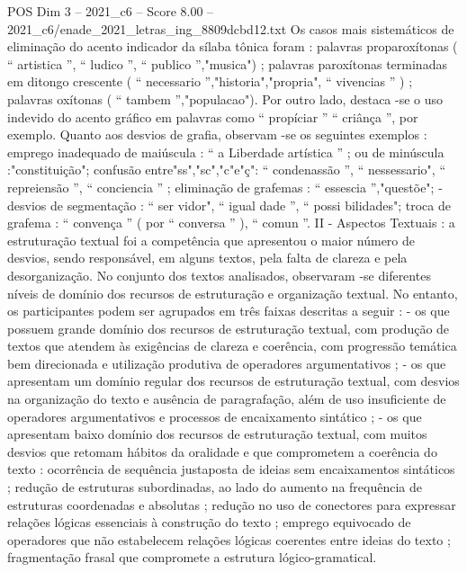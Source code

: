 \begin{textsample}{POS Dim 3 – 2021\_c6 – Score 8.00 – 2021\_c6/enade\_2021\_letras\_ing\_8809dcbd12.txt}
Os casos mais sistemáticos de eliminação do acento indicador da sílaba tônica foram : palavras proparoxítonas ( “ artistica ”, “ ludico ”, “ publico ”,"musica") ; palavras paroxítonas terminadas em ditongo crescente ( “ necessario ”,"historia","propria", “ vivencias ” ) ; palavras oxítonas ( “ tambem ”,"populacao").
Por outro lado, destaca -se o uso indevido do acento gráfico em palavras como “ propíciar ” “ criânça ”, por exemplo.
Quanto aos desvios de grafia, observam -se os seguintes exemplos : emprego inadequado de maiúscula : “ a Liberdade artística ” ; ou de minúscula :"constituição"; confusão entre"ss","sc","c"e"ç": “ condenassão ”, “ nessessario", “ repreiensão ”, “ conciencia ” ; eliminação de grafemas : “ essescia ”,"questõe"; - desvios de segmentação : “ ser vidor", “ igual dade ”, “ possi bilidades"; troca de grafema : “ convença ” ( por “ conversa ” ), “ comun ”.
II - Aspectos Textuais : a estruturação textual foi a competência que apresentou o maior número de desvios, sendo responsável, em alguns textos, pela falta de clareza e pela desorganização.
No conjunto dos textos analisados, observaram -se diferentes níveis de domínio dos recursos de estruturação e organização textual.
No entanto, os participantes podem ser agrupados em três faixas descritas a seguir : - os que possuem grande domínio dos recursos de estruturação textual, com produção de textos que atendem às exigências de clareza e coerência, com progressão temática bem direcionada e utilização produtiva de operadores argumentativos ; - os que apresentam um domínio regular dos recursos de estruturação textual, com desvios na organização do texto e ausência de paragrafação, além de uso insuficiente de operadores argumentativos e processos de encaixamento sintático ; - os que apresentam baixo domínio dos recursos de estruturação textual, com muitos desvios que retomam hábitos da oralidade e que comprometem a coerência do texto : ocorrência de sequência justaposta de ideias sem encaixamentos sintáticos ; redução de estruturas subordinadas, ao lado do aumento na frequência de estruturas coordenadas e absolutas ; redução no uso de conectores para expressar relações lógicas essenciais à construção do texto ; emprego equivocado de operadores que não estabelecem relações lógicas coerentes entre ideias do texto ; fragmentação frasal que compromete a estrutura lógico-gramatical.

\end{textsample}
